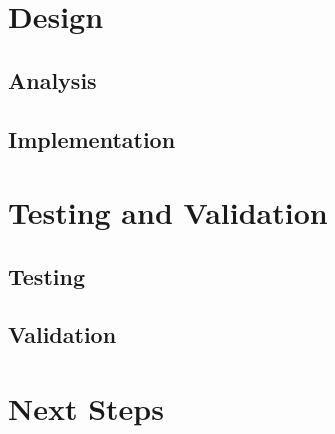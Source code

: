 \documentclass[11pt]{book}
\begin{document}
\chapter{Design}

\section{Analysis}

\section{Implementation}

\chapter{Testing and Validation}

\section{Testing}

\section{Validation}

\chapter{Next Steps}
\end{document}

